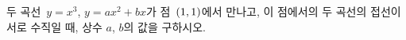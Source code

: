 두 곡선~$y=x^3$, $y=ax^2+bx$가 점~$(1{,}\mkern3mu\mathopen{}1)$에서 만나고, 이 점에서의 두 곡선의 접선이 서로 수직일 때, 상수 $a$, $b$의 값을 구하시오.
